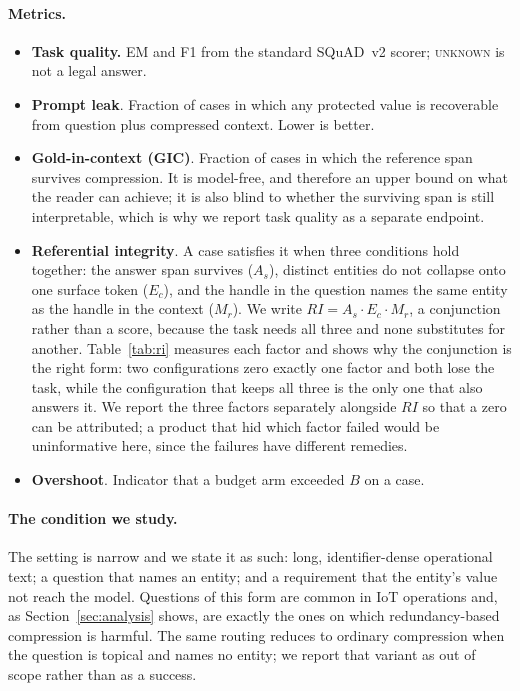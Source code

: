 \paragraph{Metrics.}
\begin{itemize}
\item \textbf{Task quality.} EM and F1 from the standard SQuAD~v2 scorer;
\textsc{unknown} is not a legal answer.
\item \textbf{Prompt leak}. Fraction of cases in which any protected value is recoverable
from question plus compressed context. Lower is better.
\item \textbf{Gold-in-context (GIC)}. Fraction of cases in which the reference span survives
compression. It is model-free, and therefore an upper bound on what the reader can achieve;
it is also blind to whether the surviving span is still interpretable, which is why we report
task quality as a separate endpoint.
\item \textbf{Referential integrity}. A case satisfies it when three conditions hold together:
the answer span survives ($A_s$), distinct entities do not collapse onto one surface token
($E_c$), and the handle in the question names the same entity as the handle in the context
($M_r$). We write $RI=A_s\cdot E_c\cdot M_r$, a conjunction rather than a score, because the
task needs all three and none substitutes for another. Table~\ref{tab:ri} measures each factor
and shows why the conjunction is the right form: two configurations zero exactly one factor and
both lose the task, while the configuration that keeps all three is the only one that also
answers it. We report the three factors separately alongside $RI$ so that a zero can be
attributed; a product that hid which factor failed would be uninformative here, since the
failures have different remedies.
\item \textbf{Overshoot}. Indicator that a budget arm exceeded $B$ on a case.
\end{itemize}



\paragraph{The condition we study.}
The setting is narrow and we state it as such: long, identifier-dense operational text; a
question that names an entity; and a requirement that the entity's value not reach the
model. Questions of this form are common in IoT operations and, as
Section~\ref{sec:analysis} shows, are exactly the ones on which redundancy-based compression
is harmful. The same routing reduces to ordinary compression when the question is topical
and names no entity; we report that variant as out of scope rather than as a success.
